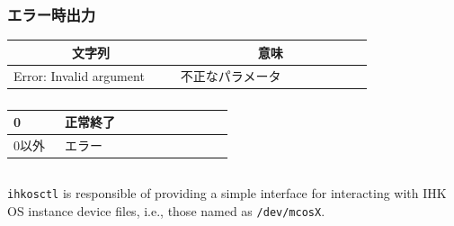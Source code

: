 \documentclass[twoside,11pt,fleqn]{book}
\begin{document}
\subsubsection*{エラー時出力}{\quad}
\begin{table}[!h]
\footnotesize
\begin{tabular}{|p{0.40\linewidth}|p{0.46\linewidth}|} \hline
\multicolumn{1}{|c}{\textbf{文字列}}&\multicolumn{1}{|c|}{\textbf{意味}}\\ \hline \hline
Error: Invalid argument&不正なパラメータ\\ \hline
\end{tabular}
\vspace{-0em}
\end{table}
\FloatBarrier

\subsubsection*{}
\begin{table}[!h]
\footnotesize
\begin{tabular}{|p{0.20\linewidth}|p{0.66\linewidth}|} \hline
0&正常終了\\ \hline
0以外&エラー\\ \hline
\end{tabular}
\vspace{-0em}
\end{table}
\FloatBarrier

\subsection{}

\texttt{ihkosctl} is responsible of providing a simple interface for
interacting with IHK OS instance device files, i.e.,
those named as \texttt{/dev/mcosX}.
\end{document}
